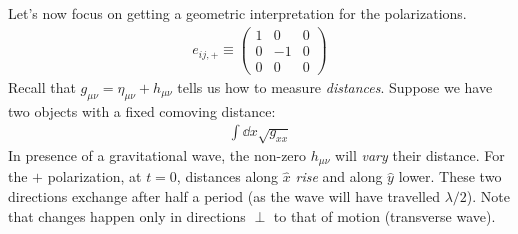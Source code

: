 \documentclass[../template.tex]{subfiles}
\begin{document}
Let's now focus on getting a geometric interpretation for the polarizations.
\begin{align*}
    e_{ij,+} \equiv \left(\begin{array}{ccc}
    1 & 0 & 0 \\ 
    0 & -1 & 0 \\ 
    0 & 0 & 0
    \end{array}\right)
\end{align*}
Recall that $g_{\mu \nu} = \eta_{\mu \nu} + h_{\mu \nu}$ tells us how to measure \textit{distances}. Suppose we have two objects with a fixed comoving distance:
\begin{align*}
    \int \dd{x} \sqrt{g_{x x}}
\end{align*}
In presence of a gravitational wave, the non-zero $h_{\mu \nu}$ will \textit{vary} their distance. 
For the $+$ polarization, at $t=0$, distances along $\hat{x}$ \textit{rise} and along $\hat{y}$ lower. These two directions exchange after half a period (as the wave will have travelled $\lambda/2$). Note that changes happen only in directions $\perp$ to that of motion (transverse wave).  %
\end{document}
